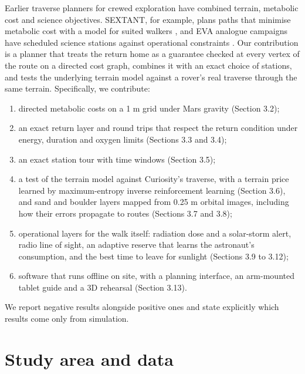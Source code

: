 \documentclass[11pt,a4paper]{article}
\begin{document}
Earlier traverse planners for crewed exploration have combined terrain, metabolic cost and science objectives. SEXTANT, for example, plans paths that minimise metabolic cost with a model for suited walkers \cite{Johnson2010}, and EVA analogue campaigns have scheduled science stations against operational constraints \cite{Marquez2019,Brady2019}. Our contribution is a planner that treats the return home as a guarantee checked at every vertex of the route on a directed cost graph, combines it with an exact choice of stations, and tests the underlying terrain model against a rover's real traverse through the same terrain. Specifically, we contribute:

\begin{enumerate}

\item directed metabolic costs on a 1 m grid under Mars gravity (Section 3.2);

\item an exact return layer and round trips that respect the return condition under energy, duration and oxygen limits (Sections 3.3 and 3.4);

\item an exact station tour with time windows (Section 3.5);

\item a test of the terrain model against Curiosity's traverse, with a terrain price learned by maximum-entropy inverse reinforcement learning (Section 3.6), and sand and boulder layers mapped from 0.25 m orbital images, including how their errors propagate to routes (Sections 3.7 and 3.8);

\item operational layers for the walk itself: radiation dose and a solar-storm alert, radio line of sight, an adaptive reserve that learns the astronaut's consumption, and the best time to leave for sunlight (Sections 3.9 to 3.12);

\item software that runs offline on site, with a planning interface, an arm-mounted tablet guide and a 3D rehearsal (Section 3.13).

\end{enumerate}

We report negative results alongside positive ones and state explicitly which results come only from simulation.

\section{Study area and data}
\end{document}
